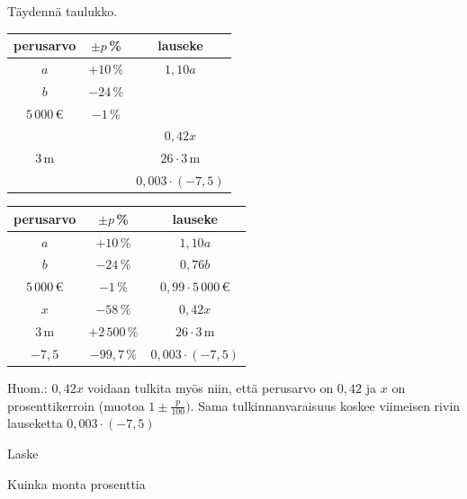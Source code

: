 \begin{tehtavasivu}
\begin{tehtava}
Täydennä taulukko. \\
\begin{tabular}{|c|c|c|} %
\hline 
perusarvo & $\pm p$\,\% & lauseke \\ 
\hline 
$a$ & $+10$\,\% & $1,10a$ \\ 
\hline 
$b$ & $-24$\,\% & \\ 
\hline 
$5\,000$\,€ & $-1$\,\% & \\ 
\hline 
 & & $0,42x$ \\ 
\hline 
 $3$\,m& & $26\cdot 3$\,m \\ 
\hline
  & &$0,003\cdot(-7,5)$ \\
\hline
\end{tabular}
	\begin{vastaus}
\begin{tabular}{|c|c|c|}
\hline 
perusarvo & $\pm p$\,\% & lauseke \\ 
\hline 
$a$ & $+10$\,\% & $1,10a$ \\ 
\hline 
$b$ & $-24$\,\% &$0,76b$ \\ 
\hline 
$5\,000$\,€ & $-1\,\%$ &$0,99\cdot5\,000\,$€ \\ 
\hline 
$x$ &$-58\,\%$ & $0,42x$ \\ 
\hline 
 $3$\,m&$+2\,500\,\%$ &$26\cdot3$\,m \\ 
 \hline
 $-7,5$ & $-99,7\,\%$ & $0,003\cdot(-7,5)$ \\
  \hline %
\end{tabular}

Huom.: $0,42x$ voidaan tulkita myös niin, että perusarvo on $0,42$ ja $x$ on prosenttikerroin (muotoa $1\pm \frac{p}{100})$. Sama tulkinnanvaraisuus koskee viimeisen rivin lauseketta $0,003\cdot (-7,5)$
	\end{vastaus}
\end{tehtava}

\begin{tehtava}
    Laske
    \begin{vastaus}
    \end{vastaus}
\end{tehtava}

\begin{tehtava}
    Kuinka monta prosenttia
    \begin{vastaus}
    \end{vastaus}
\end{tehtava}


\end{tehtavasivu}
